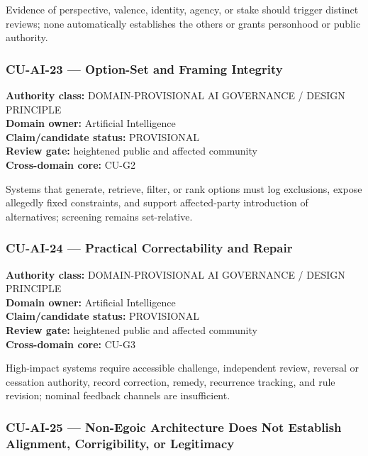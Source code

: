\documentclass[
  11pt,
]{article}
\begin{document}
Evidence of perspective, valence, identity, agency, or stake should
trigger distinct reviews; none automatically establishes the others or
grants personhood or public authority.

\subsubsection{CU-AI-23 --- Option-Set and Framing
Integrity}\label{cu-ai-23-option-set-and-framing-integrity}

\textbf{Authority class:} DOMAIN-PROVISIONAL AI GOVERNANCE / DESIGN
PRINCIPLE\\
\textbf{Domain owner:} Artificial Intelligence\\
\textbf{Claim/candidate status:} PROVISIONAL\\
\textbf{Review gate:} heightened public and affected community\\
\textbf{Cross-domain core:} CU-G2

Systems that generate, retrieve, filter, or rank options must log
exclusions, expose allegedly fixed constraints, and support
affected-party introduction of alternatives; screening remains
set-relative.

\subsubsection{CU-AI-24 --- Practical Correctability and
Repair}\label{cu-ai-24-practical-correctability-and-repair}

\textbf{Authority class:} DOMAIN-PROVISIONAL AI GOVERNANCE / DESIGN
PRINCIPLE\\
\textbf{Domain owner:} Artificial Intelligence\\
\textbf{Claim/candidate status:} PROVISIONAL\\
\textbf{Review gate:} heightened public and affected community\\
\textbf{Cross-domain core:} CU-G3

High-impact systems require accessible challenge, independent review,
reversal or cessation authority, record correction, remedy, recurrence
tracking, and rule revision; nominal feedback channels are insufficient.

\subsubsection{CU-AI-25 --- Non-Egoic Architecture Does Not Establish
Alignment, Corrigibility, or
Legitimacy}\label{cu-ai-25-non-egoic-architecture-does-not-establish-alignment-corrigibility-or-legitimacy}
\end{document}
